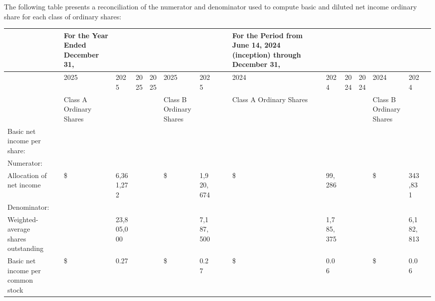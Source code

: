 \documentclass[11pt,a4paper]{article}
\begin{document}
The following table presents a reconciliation of the numerator and denominator used to compute basic and diluted net income ordinary share for each class of ordinary shares:

\begin{table}[h]
\begin{tabular}{|l|l|l|l|l|l|l|l|l|l|l|l|l|l|l|l|l|}
\hline
 &  & For the Year Ended December 31, &  &  &  &  &  &  &  & For the Period from June 14, 2024 (inception) through December 31, &  &  &  &  &  &  \\ \hline
 &  & 2025 & 2025 & 2025 & 2025 & 2025 & 2025 &  &  & 2024 & 2024 & 2024 & 2024 & 2024 & 2024 &  \\ \hline
 &  & Class A Ordinary Shares &  &  &  & Class B Ordinary Shares &  &  &  & Class A Ordinary Shares &  &  &  & Class B Ordinary Shares &  &  \\ \hline
Basic net income per share: &  &  &  &  &  &  &  &  &  &  &  &  &  &  &  &  \\ \hline
Numerator: &  &  &  &  &  &  &  &  &  &  &  &  &  &  &  &  \\ \hline
Allocation of net income &  & \$ & 6,361,272 &  &  & \$ & 1,920,674 &  &  & \$ & 99,286 &  &  & \$ & 343,831 &  \\ \hline
Denominator: &  &  &  &  &  &  &  &  &  &  &  &  &  &  &  &  \\ \hline
Weighted-average shares outstanding &  &  & 23,805,000 &  &  &  & 7,187,500 &  &  &  & 1,785,375 &  &  &  & 6,182,813 &  \\ \hline
Basic net income per common stock &  & \$ & 0.27 &  &  & \$ & 0.27 &  &  & \$ & 0.06 &  &  & \$ & 0.06 &  \\ \hline
\end{tabular}
\end{table}
\end{document}

